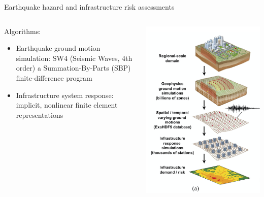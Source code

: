 \documentclass[hangout,aspectratio=1610,10pt]{beamer}
\begin{document}
\begin{frame}{Earthquake hazard and infrastructure risk assessments}
\begin{columns}
\begin{column}{.6\columnwidth}
Algorithms:
\begin{itemize}
	\item Earthquake ground motion simulation: SW4 (Seismic Waves, 4th order) a Summation-By-Parts (SBP) finite-difference program 
	\item Infrastructure system response: implicit, nonlinear finite element representations
\end{itemize}
\end{column}
\begin{column}{.3\columnwidth}
		\includegraphics[width=1.2\linewidth]{plots/fig2}
\end{column}
\end{columns}
\end{frame}
\end{document}
